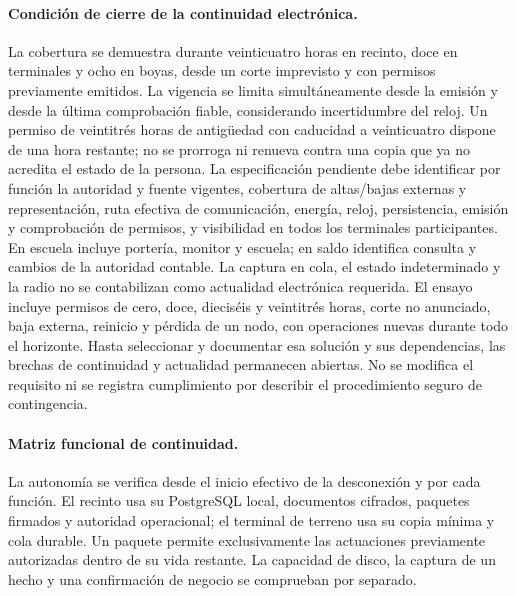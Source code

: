 \paragraph{Condición de cierre de la continuidad electrónica.}
La cobertura se demuestra durante veinticuatro horas en recinto, doce en terminales y ocho en boyas, desde un corte imprevisto y con permisos previamente emitidos. La vigencia se limita simultáneamente desde la emisión y desde la última comprobación fiable, considerando incertidumbre del reloj. Un permiso de veintitrés horas de antigüedad con caducidad a veinticuatro dispone de una hora restante; no se prorroga ni renueva contra una copia que ya no acredita el estado de la persona.
La especificación pendiente debe identificar por función la autoridad y fuente vigentes, cobertura de altas/bajas externas y representación, ruta efectiva de comunicación, energía, reloj, persistencia, emisión y comprobación de permisos, y visibilidad en todos los terminales participantes. En escuela incluye portería, monitor y escuela; en saldo identifica consulta y cambios de la autoridad contable. La captura en cola, el estado indeterminado y la radio no se contabilizan como actualidad electrónica requerida.
El ensayo incluye permisos de cero, doce, dieciséis y veintitrés horas, corte no anunciado, baja externa, reinicio y pérdida de un nodo, con operaciones nuevas durante todo el horizonte. Hasta seleccionar y documentar esa solución y sus dependencias, las brechas de continuidad y actualidad permanecen abiertas. No se modifica el requisito ni se registra cumplimiento por describir el procedimiento seguro de contingencia.
\paragraph{Matriz funcional de continuidad.}
La autonomía se verifica desde el inicio efectivo de la desconexión y por cada función. El recinto usa su PostgreSQL local, documentos cifrados, paquetes firmados y autoridad operacional; el terminal de terreno usa su copia mínima y cola durable. Un paquete permite exclusivamente las actuaciones previamente autorizadas dentro de su vida restante. La capacidad de disco, la captura de un hecho y una confirmación de negocio se comprueban por separado.

